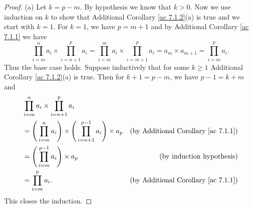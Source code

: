 \begin{proof}{(a)}
    Let \(k = p - m\).
    By hypothesis we know that \(k > 0\).
    Now we use induction on \(k\) to show that Additional Corollary \ref{ac 7.1.2}(a) is true and we start with \(k = 1\).
    For \(k = 1\), we have \(p = m + 1\) and by Additional Corollary \ref{ac 7.1.1} we have
    \[
        \prod_{i = m}^n a_i \times \prod_{i = n + 1}^p a_i = \prod_{i = m}^m a_i \times \prod_{i = m + 1}^p a_i = a_m \times a_{m + 1} = \prod_{i = m}^p a_i.
    \]
    Thus the base case holds.
    Suppose inductively that for some \(k \geq 1\) Additional Corollary \ref{ac 7.1.2}(a) is true.
    Then for \(k + 1 = p - m\), we have \(p - 1 = k + m\) and
    \begin{align*}
         & \prod_{i = m}^n a_i \times \prod_{i = n + 1}^p a_i                                                                                              \\
         & = \Bigg(\prod_{i = m}^n a_i\Bigg) \times \Bigg(\prod_{i = n + 1}^{p - 1} a_i\Bigg) \times a_p & \text{(by Additional Corollary \ref{ac 7.1.1})} \\
         & = \Bigg(\prod_{i = m}^{p - 1} a_i\Bigg) \times a_p                                            & \text{(by induction hypothesis)}                \\
         & = \prod_{i = m}^p a_i.                                                                        & \text{(by Additional Corollary \ref{ac 7.1.1})}
    \end{align*}
    This closes the induction.
\end{proof}

